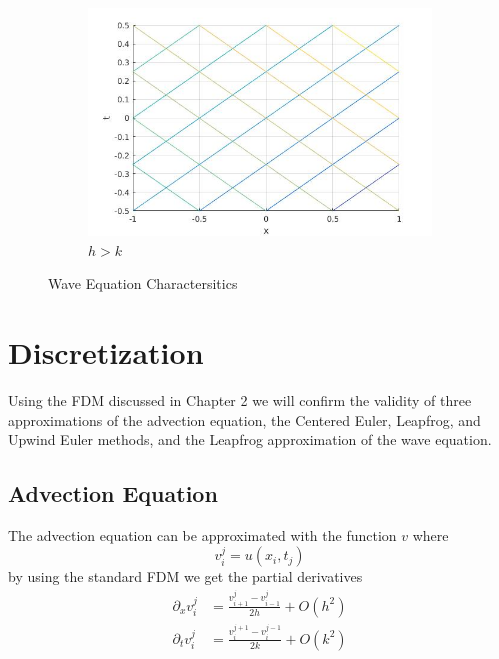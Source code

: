 \begin{figure}[H]
\begin{subfigure}[b]{0.3\textwidth}
  \includegraphics[width=\textwidth]{Images/wave_h>k.jpg}
  \caption{$h>k$}
  \label{fig:wci3}
\end{subfigure}
\caption{Wave Equation Charactersitics}
\label{fig:wavecoordimg}
\end{figure}
\section{Discretization}
Using the FDM discussed in Chapter 2 we will confirm the validity of three approximations of the advection equation, the Centered Euler, Leapfrog, and Upwind Euler methods, and the Leapfrog approximation of the wave equation.
\subsection{Advection Equation}
The advection equation can be approximated with the function $v$ where
\begin{equation}
v_i^j = u(x_i,t_j)
\end{equation}
by using the standard FDM we get the partial derivatives
\begin{equation}\label{advfdm}
\begin{align}
    \partial_xv_i^j &= \frac{v_{i+1}^j - v_{i-1}^j}{2h} + O(h^2) \\
    \partial_tv_i^j &= \frac{v_i^{j+1} - v_i^{j-1}}{2k} + O(k^2)
\end{align}
\end{equation}
